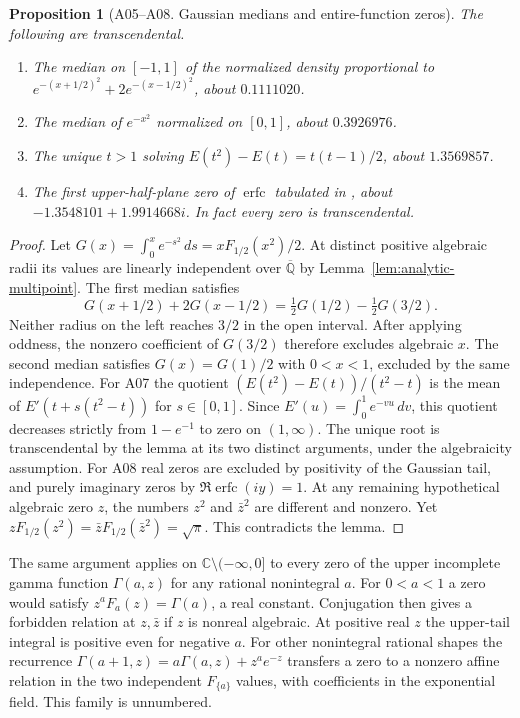 \documentclass[11pt,a4paper]{article}
\newtheorem{proposition}[theorem]{Proposition}
\theoremstyle{definition}
\theoremstyle{remark}
\begin{document}
\par\hypertarget{cat-A05}{}\label{page:A05}\hypertarget{cat-A06}{}\label{page:A06}\hypertarget{cat-A07}{}\label{page:A07}\hypertarget{cat-A08}{}\label{page:A08}
\begin{proposition}[A05--A08. Gaussian medians and entire-function zeros]
The following are transcendental.
\begin{enumerate}
\item[\textbf{A05.}] The median on $[-1,1]$ of the normalized density
proportional to $e^{-(x+1/2)^2}+2e^{-(x-1/2)^2}$, about $0.1111020$.
\item[\textbf{A06.}] The median of $e^{-x^2}$ normalized on $[0,1]$,
about $0.3926976$.
\item[\textbf{A07.}] The unique $t>1$ solving
$E(t^2)-E(t)=t(t-1)/2$, about $1.3569857$.
\item[\textbf{A08.}] The first upper-half-plane zero of
$\operatorname{erfc}$ tabulated in \cite[\S7.13]{aDLMF},
about $-1.3548101+1.9914668i$. In fact every zero is transcendental.
\end{enumerate}
\end{proposition}
\begin{proof}
Let $G(x)=\int_0^xe^{-s^2}\,ds=xF_{1/2}(x^2)/2$. At distinct positive
algebraic radii its values are linearly independent over
$\overline{\mathbb Q}$ by Lemma~\ref{lem:analytic-multipoint}.
The first median satisfies
\[
 G(x+1/2)+2G(x-1/2)=\tfrac12G(1/2)-\tfrac12G(3/2).
\]
Neither radius on the left reaches $3/2$ in the open interval.
After applying oddness, the nonzero coefficient of $G(3/2)$ therefore
excludes algebraic $x$. The second median satisfies $G(x)=G(1)/2$ with
$0<x<1$, excluded by the same independence.
For A07 the quotient $(E(t^2)-E(t))/(t^2-t)$ is the mean of
$E'(t+s(t^2-t))$ for $s\in[0,1]$. Since
$E'(u)=\int_0^1 e^{-vu}\,dv$, this quotient decreases strictly from
$1-e^{-1}$ to zero on $(1,\infty)$. The unique root is transcendental by
the lemma at its two distinct arguments, under the algebraicity assumption.
For A08 real zeros are excluded by positivity of the Gaussian tail,
and purely imaginary zeros by $\Re\operatorname{erfc}(iy)=1$.
At any remaining hypothetical algebraic zero $z$, the numbers
$z^2$ and $\bar z^2$ are different and nonzero. Yet
$zF_{1/2}(z^2)=\bar zF_{1/2}(\bar z^2)=\sqrt\pi$. This contradicts
the lemma.
\end{proof}

The same argument applies on $\mathbb C\setminus(-\infty,0]$ to
every zero of the upper incomplete gamma function $\Gamma(a,z)$
for any rational nonintegral $a$. For $0<a<1$ a zero would satisfy
$z^aF_a(z)=\Gamma(a)$, a real constant. Conjugation then gives a
forbidden relation at $z,\bar z$ if $z$ is nonreal algebraic.
At positive real $z$ the upper-tail integral is positive even for
negative $a$. For other nonintegral rational shapes the recurrence
$\Gamma(a+1,z)=a\Gamma(a,z)+z^ae^{-z}$ transfers a zero to
a nonzero affine relation in the two independent $F_{\{a\}}$ values,
with coefficients in the exponential field. This family is unnumbered.
\end{document}
